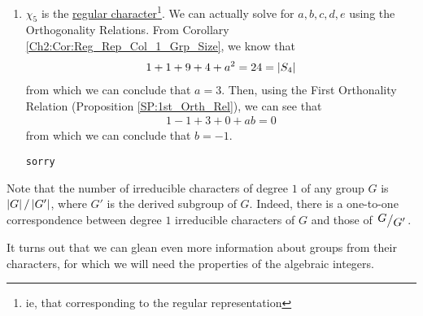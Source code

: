 \begin{boxexample}[$S_4$]
\begin{enumerate}
        \item $\chi_5$ is the \underline{regular character}\footnote{ie, that corresponding to the regular representation}. We can actually solve for $a,b,c,d,e$ using the Orthogonality Relations. From Corollary \ref{Ch2:Cor:Reg_Rep_Col_1_Grp_Size}, we know that
        \begin{align*}
            1 + 1 + 9 + 4 + a^2 = 24 = \left\lvert S_4 \right\rvert
        \end{align*}
        from which we can conclude that $a = 3$. Then, using the First Orthonality Relation (Proposition \ref{SP:1st_Orth_Rel}), we can see that
        \begin{align*}
            1 - 1 + 3 + 0 + ab = 0
        \end{align*}
        from which we can conclude that $b = -1$.

        \verb|sorry|
    \end{enumerate}
\end{boxexample}

Note that the number of irreducible characters of degree $1$ of any group $G$ is $\left\lvert G \right\rvert / \left\lvert G' \right\rvert$, where $G'$ is the derived subgroup of $G$. Indeed, there is a one-to-one correspondence between degree $1$ irreducible characters of $G$ and those of $\quotient{G}{G'}$.

It turns out that we can glean even more information about groups from their characters, for which we will need the properties of the algebraic integers.